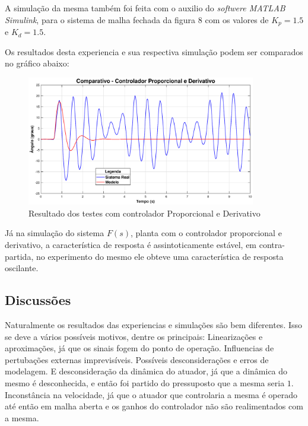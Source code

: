 \documentclass[conference,harvard,brazil,english]{sbatex}
\begin{document}
            A simulação da mesma também foi feita com o auxilio do \textit{softwere MATLAB Simulink}, para o sistema de malha fechada da figura 8 com os valores de $K_p=1.5$ e $K_d=1.5$.
             
            Os resultados desta experiencia e sua respectiva simulação podem ser comparados no gráfico abaixo:
            
            \begin{figure}[h]
                \hspace{-18mm}
                \includegraphics[width=10cm]{imagens/graficos/ComparativoPD.eps}
                \caption{Resultado dos testes com controlador Proporcional e Derivativo}
            \end{figure}
            
            Já na simulação do sistema $F(s)$, planta com o controlador proporcional e derivativo, a característica de resposta é assintoticamente estável, em contra-partida, no experimento do mesmo ele obteve uma característica de resposta oscilante.
            
        \subsection{Discussões}
            
            Naturalmente os resultados das experiencias e simulações são bem diferentes. Isso se deve a vários possíveis motivos, dentre os principais: Linearizações e aproximações, já que os sinais fogem do ponto de operação. Influencias de pertubações externas imprevisíveis. Possíveis desconsiderações e erros de modelagem. E desconsideração da dinâmica do atuador, já que a dinâmica do mesmo é desconhecida, e então foi partido do pressuposto que a mesma seria $1$. Inconstância na velocidade, já que o atuador que controlaria a mesma é operado até então em malha aberta e os ganhos do controlador não são realimentados com a mesma.
        
\end{document}
